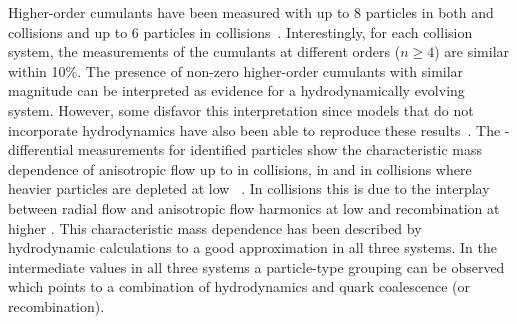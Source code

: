 \documentclass[../report.tex]{subfiles}
\begin{document}
Higher-order cumulants have been measured with up to 8 particles in both \PbPb and \pPb collisions and up to 6 particles in \pp collisions~\cite{Aad:2013fja,Chatrchyan:2013nka,Khachatryan:2016txc,Aamodt:2010pa,ALICE:2011ab,Chatrchyan:2012ta,Abelev:2014mda,Chatrchyan:2013kba,Aad:2014vba,Khachatryan:2015waa,Adam:2016izf,CMS:2015ica,Sirunyan:2017pan,Sirunyan:2017igb,Aaboud:2017acw,Aaboud:2017blb}. Interestingly, for each collision system, the measurements of the cumulants at different orders ($n \geq 4$) are similar within 10\%. The presence of non-zero higher-order cumulants with similar magnitude can be interpreted as evidence for a hydrodynamically evolving system. However, some disfavor this interpretation since models that do not incorporate hydrodynamics have also been able to reproduce these results~\cite{Jia:2014pza,Gyulassy:2014cfa,McLerran:2014uka}. The \pT-differential \vn measurements for identified particles show the characteristic mass dependence of anisotropic flow up to \vfive in \PbPb collisions, \vthree in \pPb and \vtwo in \pp collisions where heavier particles are depleted at low \pT~\cite{Abelev:2014pua,Abelev:2012di,Adam:2016nfo,Khachatryan:2014jra,ABELEV:2013wsa,CMS:2015kua,Khachatryan:2016txc,Acharya:2018zuq}. In \PbPb collisions this is due to the interplay between radial flow and anisotropic flow harmonics at low \pT and recombination at higher \pT. This characteristic mass dependence has been described by hydrodynamic calculations to a good approximation in all three systems. In the intermediate \pT values in all three systems a particle-type grouping can be observed which points to a combination of hydrodynamics and quark coalescence (or recombination).
\end{document}
